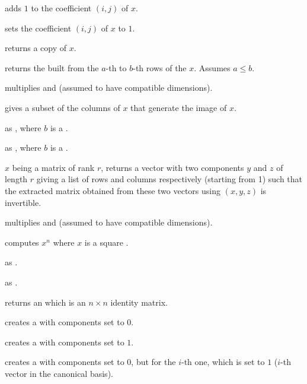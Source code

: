  adds $1$ to the coefficient $(i,j)$
of $x$.

 sets the coefficient $(i,j)$ of $x$
to $1$.

 returns a copy of $x$.

 returns the  built
from the $a$-th to $b$-th rows of the  $x$. Assumes $a \leq b$.

 multiplies   and  (assumed
to have compatible dimensions).

 gives a subset of the columns of $x$ that generate
the image of $x$.



as , where $b$ is a .

as , where $b$ is a .


 $x$ being a matrix of rank $r$, returns a
vector with two  components $y$ and $z$ of length $r$ giving a
list of rows and columns respectively (starting from 1) such that the extracted
matrix obtained from these two vectors using $(x,y,z)$ is
invertible.

 multiplies   and  (assumed to
have compatible dimensions).

 computes $x^n$ where $x$ is a square
.

 as .

 as .

 returns an  which is an $n \times n$
identity matrix.

 creates a  with  components set to
$0$.

 creates a  with  components set to
$1$.

 creates a  with  components
set to $0$, but for the $i$-th one, which is set to $1$ ($i$-th vector in the
canonical basis).

